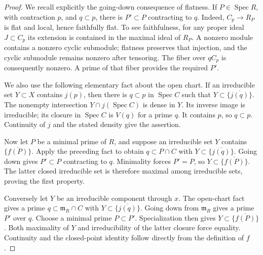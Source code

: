 \begin{proof}
We recall explicitly the going-down consequence of flatness.
If \(P\in\operatorname{Spec}R\), with contraction \(p\),
and \(q\subset p\), there is \(P'\subset P\) contracting to
\(q\).  Indeed, \(C_p\to R_P\) is flat and local, hence
faithfully flat.  To see faithfulness, for any proper ideal
\(J\subset C_p\) its extension is contained in the maximal
ideal of \(R_P\).  A nonzero module contains a nonzero cyclic
submodule; flatness preserves that injection, and the cyclic
submodule remains nonzero after tensoring.  The fiber over
\(qC_p\) is consequently nonzero.  A prime of that fiber
provides the required \(P'\).

We also use the following elementary fact about the open chart.
If an irreducible set \(Y\subset X\) contains \(j(p)\), then
there is \(q\subset p\) in \(\operatorname{Spec}C\) such that
\(Y\subset\overline{\{j(q)\}}\).
The nonempty intersection \(Y\cap j(\operatorname{Spec}C)\)
is dense in \(Y\).  Its inverse image is irreducible; its
closure in \(\operatorname{Spec}C\) is \(V(q)\) for a prime
\(q\).  It contains \(p\), so \(q\subset p\).
Continuity of \(j\) and the stated density give the assertion.

Now let \(P\) be a minimal prime of \(R\), and suppose an
irreducible set \(Y\) contains \(\overline{\{f(P)\}}\).
Apply the preceding fact to obtain \(q\subset P\cap C\)
with \(Y\subset\overline{\{j(q)\}}\).  Going down gives
\(P'\subset P\) contracting to \(q\).  Minimality forces
\(P'=P\), so \(Y\subset\overline{\{f(P)\}}\).
The latter closed irreducible set is therefore maximal among
irreducible sets, proving the first property.

Conversely let \(Y\) be an irreducible component through \(x\).
The open-chart fact gives a prime
\(q\subset\mathfrak m_R\cap C\) with
\(Y\subset\overline{\{j(q)\}}\).  Going down from
\(\mathfrak m_R\) gives a prime \(P'\) over \(q\).
Choose a minimal prime \(P\subset P'\).
Specialization then gives
\(Y\subset\overline{\{f(P)\}}\).
Both maximality of \(Y\) and irreducibility of the latter
closure force equality.  Continuity and the closed-point
identity follow directly from the definition of \(f\).
\end{proof}

